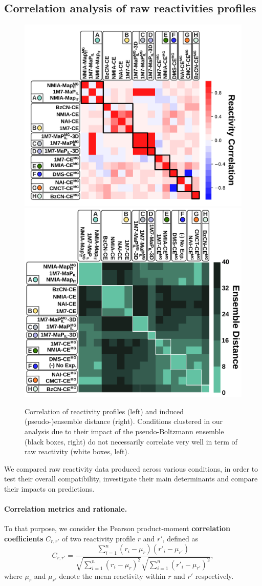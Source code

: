 \documentclass[11pt]{article} %
\renewcommand{\Def}[1]{{\bf #1}}
\begin{document}
\subsection{Correlation analysis of raw reactivities profiles}
\begin{figure}[H]
	\includegraphics[width=.54\textwidth]{graphs/didy/reactivity_correlation.pdf}\hfill
	\includegraphics[width=.45\textwidth]{graphs/didy/bi_clustering.pdf}
	\caption{Correlation of reactivity profiles (left) and induced (pseudo-)ensemble distance (right). Conditions clustered in our analysis due to their impact of the pseudo-Boltzmann ensemble (black boxes, right) do not necessarily correlate very well in term of raw reactivity (white boxes, left).\label{fig:profile_correlation}}
\end{figure}

We compared raw reactivity data produced across various conditions, in order to test their overall compatibility, investigate their main determinants and compare their impacts on predictions.

\paragraph{Correlation metrics and rationale.}To that purpose, we consider the Pearson product-moment \Def{correlation coefficients} $C_{r,r'}$ of two reactivity profile $r$ and $r'$, defined as
$$ C_{r,r'} = \frac{\sum^n_{i=1}\left(r_i - \mu_r\right)\left(r'_i - \mu_{r'}\right)}{\sqrt{\sum ^n _{i=1}\left(r_i - \mu_{r}\right)^2} \sqrt{\sum ^n _{i=1}\left(r'_i - \mu_{r'}\right)^2}},$$ 
where $\mu_{r}$ and $\mu_{r'}$  denote the mean reactivity within $r$ and $r'$ respectively. 
\end{document}
